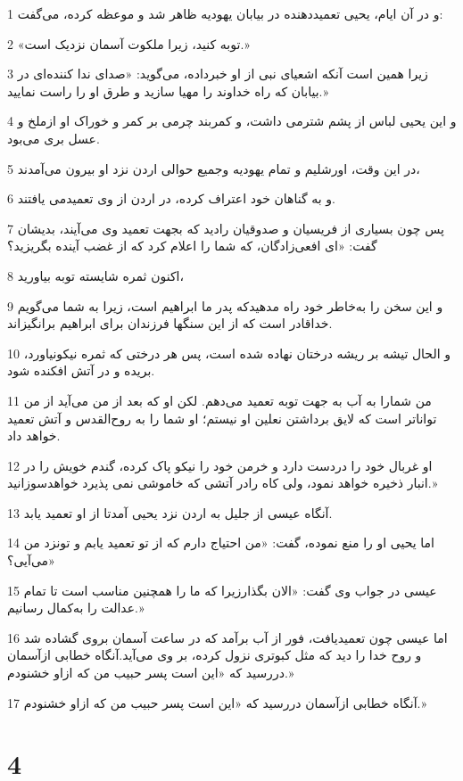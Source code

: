\par 1 و در آن ایام، یحیی تعمید‌دهنده در بیابان یهودیه ظاهر شد و موعظه کرده، می‌گفت:
\par 2 «توبه کنید، زیرا ملکوت آسمان نزدیک است.»
\par 3 زیرا همین است آنکه اشعیای نبی از او خبرداده، می‌گوید: «صدای ندا کننده‌ای در بیابان که راه خداوند را مهیا سازید و طرق او را راست نمایید.»
\par 4 و این یحیی لباس از پشم شترمی داشت، و کمربند چرمی بر کمر و خوراک او ازملخ و عسل بری می‌بود.
\par 5 در این وقت، اورشلیم و تمام یهودیه وجمیع حوالی اردن نزد او بیرون می‌آمدند،
\par 6 و به گناهان خود اعتراف کرده، در اردن از وی تعمیدمی یافتند.
\par 7 پس چون بسیاری از فریسیان و صدوقیان رادید که بجهت تعمید وی می‌آیند، بدیشان گفت: «ای افعی‌زادگان، که شما را اعلام کرد که از غضب آینده بگریزید؟
\par 8 اکنون ثمره شایسته توبه بیاورید،
\par 9 و این سخن را به‌خاطر خود راه مدهیدکه پدر ما ابراهیم است، زیرا به شما می‌گویم خداقادر است که از این سنگها فرزندان برای ابراهیم برانگیزاند.
\par 10 و الحال تیشه بر ریشه درختان نهاده شده است، پس هر درختی که ثمره نیکونیاورد، بریده و در آتش افکنده شود.
\par 11 من شمارا به آب به جهت توبه تعمید می‌دهم. لکن او که بعد از من می‌آید از من تواناتر است که لایق برداشتن نعلین او نیستم؛ او شما را به روح‌القدس و آتش تعمید خواهد داد.
\par 12 او غربال خود را دردست دارد و خرمن خود را نیکو پاک کرده، گندم خویش را در انبار ذخیره خواهد نمود، ولی کاه رادر آتشی که خاموشی نمی پذیرد خواهدسوزانید.»
\par 13 آنگاه عیسی از جلیل به اردن نزد یحیی آمدتا از او تعمید یابد.
\par 14 اما یحیی او را منع نموده، گفت: «من احتیاج دارم که از تو تعمید یابم و تونزد من می‌آیی؟»
\par 15 عیسی در جواب وی گفت: «الان بگذارزیرا که ما را همچنین مناسب است تا تمام عدالت را به‌کمال رسانیم.»
\par 16 اما عیسی چون تعمیدیافت، فور از آب برآمد که در ساعت آسمان بروی گشاده شد و روح خدا را دید که مثل کبوتری نزول کرده، بر وی می‌آید.آنگاه خطابی ازآسمان در‌رسید که «این است پسر حبیب من که ازاو خشنودم.»
\par 17 آنگاه خطابی ازآسمان در‌رسید که «این است پسر حبیب من که ازاو خشنودم.»

\chapter{4}

